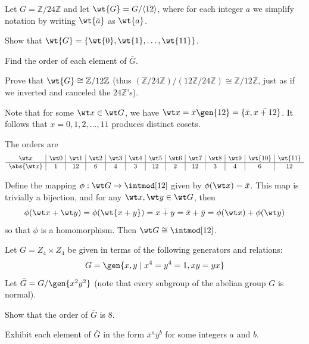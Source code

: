 \begin{problems}
\begin{solalph}
    \end{solalph}
    \item Let $G = \mathbb{Z}/24\mathbb{Z}$ and let $\wt{G} = G/\langle \bar{12} \rangle$, where for each integer $a$ we simplify notation by writing $\wt{\bar a}$ as $\wt{a}$.
    \begin{problems}
        \item Show that $\wt{G} = \{ \wt{0}, \wt{1}, \ldots, \wt{11} \}$.
        \item Find the order of each element of $\bar{G}$.
        \item Prove that $\wt{G} \cong \mathbb{Z}/12\mathbb{Z}$ (thus $(\mathbb{Z}/24\mathbb{Z})/(12\mathbb{Z}/24\mathbb{Z}) \cong \mathbb{Z}/12\mathbb{Z}$, just as if we inverted and canceled the $24\mathbb{Z}$'s).
    \end{problems}
    \begin{solalph}
        \item Note that for some $\wt x \in \wt G$, we have $\wt x = \bar x\gen{12} = \{\bar x, \bar{x + 12}\}$. It follows that $x = 0, 1, 2, \dots, 11$ produces distinct cosets.
        \item The orders are
        \[
        \begin{array}{c|c|c|c|c|c|c|c|c|c|c|c|c}
            \wt x & \wt 0 & \wt 1 & \wt 2 & \wt 3 & \wt 4 & \wt 5 & \wt 6 & \wt 7 & \wt 8 & \wt 9 & \wt{10} & \wt{11} \\
            \hline
            \abs{\wt x} & 1 & 12 & 6 & 4 & 3 & 12 & 2 & 12 & 3 & 4 & 6 & 12
        \end{array}
        \]
        \item Define the mapping $\phi : \wt G \to \intmod[12]$ given by $\phi(\wt x) = \bar x$. This map is trivially a bijection, and for any $\wt x, \wt y \in \wt G$, then
        \[\phi(\wt x + \wt y) = \phi(\wt{x + y}) = \bar{x + y} = \bar x + \bar y = \phi(\wt x) + \phi(\wt y)\]
        so that $\phi$ is a homomorphism. Then $\wt G \cong \intmod[12]$.
    \end{solalph}
    \item Let $G = Z_4 \times Z_4$ be given in terms of the following generators and relations:
    \[G = \gen{x, y \mid x^4 = y^4 = 1, xy = yx}\]
    Let $\bar G = G/\gen{x^2y^2}$ (note that every subgroup of the abelian group $G$ is normal).
    \begin{problems}
        \item Show that the order of $\bar G$ is 8.
        \item Exhibit each element of $\bar G$ in the form $\bar x^a \bar y^b$ for some integers $a$ and $b$.

\end{problems}
\end{problems}
